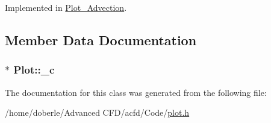 Implemented in \hyperlink{class_plot___advection_aa8f4020a38efe82391d6ec2c30cb2846}{Plot\+\_\+\+Advection}.



\subsection{Member Data Documentation}
\subsubsection[{\texorpdfstring{\+\_\+c}{_c}}]{$\ast$ Plot\+::\+\_\+c\hspace{0.3cm}{\ttfamily [protected]}}\hypertarget{class_plot_afde6de3bfd787193d73fe24f6a44a479}{}\label{class_plot_afde6de3bfd787193d73fe24f6a44a479}


The documentation for this class was generated from the following file\+:\begin{DoxyCompactItemize}
\item 
/home/doberle/\+Advanced C\+F\+D/acfd/\+Code/\hyperlink{plot_8h}{plot.\+h}\end{DoxyCompactItemize}
